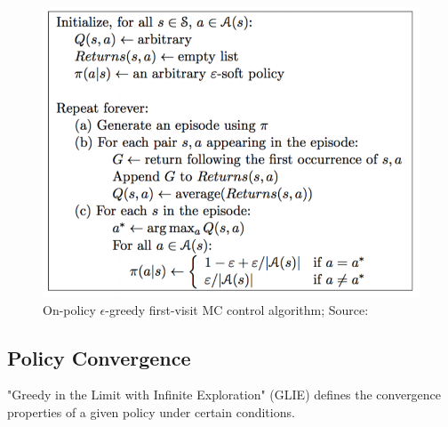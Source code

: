 \begin{figure}[h!]
  \centering
  \includegraphics[scale=0.5]{figures/fv_greedy_mc_control.PNG}
  \caption{On-policy $\epsilon$-greedy first-visit MC control algorithm; Source: \cite{lecture_mfc}}
  \label{fig:fv_mc_greedy}
\end{figure}
\newpage
\subsection{Policy Convergence}

"Greedy in the Limit with Infinite Exploration" \cite{lecture_mfc} (GLIE) defines the convergence properties of a given policy under certain conditions. 




